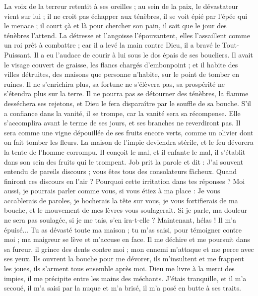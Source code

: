 \begin{multicols}{2}
La voix de la terreur retentit à ses oreilles ; au sein de la paix, le dévastateur vient sur lui ;
il ne croit pas échapper aux ténèbres, il se voit épié par l'épée qui le menace ;
il court çà et là pour chercher son pain, il sait que le jour des ténèbres l'attend.
La détresse et l'angoisse l'épouvantent, elles l'assaillent comme un roi prêt à combattre ;
car il a levé la main contre Dieu, il a bravé le Tout-Puissant.
Il a eu l'audace de courir à lui sous le dos épais de ses boucliers.
Il avait le visage couvert de graisse, les flancs chargés d'embonpoint ;
et il habite des villes détruites, des maisons que personne n’habite, sur le point de tomber en ruines.
Il ne s'enrichira plus, sa fortune ne s'élèvera pas, sa prospérité ne s'étendra plus sur la terre.
Il ne pourra pas se détourner des ténèbres, la flamme desséchera ses rejetons, et Dieu le fera disparaître par le souffle de sa bouche.
S'il a confiance dans la vanité, il se trompe, car la vanité sera sa récompense.
Elle s'accomplira avant le terme de ses jours, et ses branches ne reverdiront pas.
Il sera comme une vigne dépouillée de ses fruits encore verts, comme un olivier dont on fait tomber les fleurs.
La maison de l'impie deviendra stérile, et le feu dévorera la tente de l'homme corrompu.
Il conçoit le mal, et il enfante le mal, il s'établit dans son sein des fruits qui le trompent.
\VerseOne{}Job prit la parole et dit :
J'ai souvent entendu de pareils discours ; vous êtes tous des consolateurs fâcheux.
Quand finiront ces discours en l'air ? Pourquoi cette irritation dans tes réponses ?
Moi aussi, je pourrais parler comme vous, si vous étiez à ma place : Je vous accablerais de paroles, je hocherais la tête sur vous,
je vous fortifierais de ma bouche, et le mouvement de mes lèvres vous soulagerait.
Si je parle, ma douleur ne sera pas soulagée, si je me tais, s'en ira-t-elle ?
Maintenant, hélas ! Il m'a épuisé... Tu as dévasté toute ma maison ;
tu m'as saisi, pour témoigner contre moi ; ma maigreur se lève et m'accuse en face.
Il me déchire et me poursuit dans sa fureur, il grince des dents contre moi ; mon ennemi m'attaque et me perce avec ses yeux.
Ils ouvrent la bouche pour me dévorer, ils m'insultent et me frappent les joues, ils s'arment tous ensemble après moi.
Dieu me livre à la merci des impies, il me précipite entre les mains des méchants.
J'étais tranquille, et il m'a secoué, il m'a saisi par la nuque et m'a brisé, il m'a posé en butte à ses traits.

\end{multicols}
